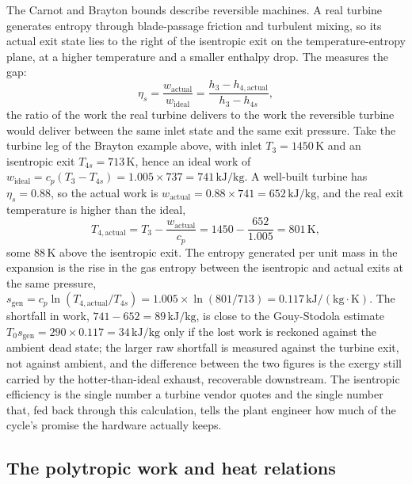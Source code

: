 The Carnot and Brayton bounds describe reversible machines. A real
turbine generates entropy through blade-passage friction and turbulent
mixing, so its actual exit state lies to the right of the isentropic exit
on the temperature-entropy plane, at a higher temperature and a smaller
enthalpy drop. The  measures the gap:
\[
\eta_s = \frac{w_{\text{actual}}}{w_{\text{ideal}}}
       = \frac{h_3 - h_{4,\text{actual}}}{h_3 - h_{4s}},
\]
the ratio of the work the real turbine delivers to the work the
reversible turbine would deliver between the same inlet state and the
same exit pressure. Take the turbine leg of the Brayton example above,
with inlet $T_3 = 1450\,\si{\kelvin}$ and an isentropic exit
$T_{4s} = 713\,\si{\kelvin}$, hence an ideal work of $w_{\text{ideal}} =
c_p (T_3 - T_{4s}) = 1.005 \times 737 = 741\,\text{kJ}/\text{kg}$. A
well-built turbine has $\eta_s = 0.88$, so the actual work is
$w_{\text{actual}} = 0.88 \times 741 = 652\,\text{kJ}/\text{kg}$, and the
real exit temperature is higher than the ideal,
\[
T_{4,\text{actual}} = T_3 - \frac{w_{\text{actual}}}{c_p}
  = 1450 - \frac{652}{1.005} = 801\,\si{\kelvin},
\]
some $88\,\si{\kelvin}$ above the isentropic exit. The entropy generated
per unit mass in the expansion is the rise in the gas entropy between the
isentropic and actual exits at the same pressure, $s_{\text{gen}} =
c_p \ln(T_{4,\text{actual}}/T_{4s}) = 1.005 \times \ln(801/713) =
0.117\,\text{kJ}/(\text{kg}\cdot\si{\kelvin})$. The shortfall in work,
$741 - 652 = 89\,\text{kJ}/\text{kg}$, is close to the Gouy-Stodola
estimate $T_0 s_{\text{gen}} = 290 \times 0.117 = 34\,\text{kJ}/\text{kg}$
only if the lost work is reckoned against the ambient dead state; the
larger raw shortfall is measured against the turbine exit, not against
ambient, and the difference between the two figures is the exergy still
carried by the hotter-than-ideal exhaust, recoverable downstream. The
isentropic efficiency is the single number a turbine vendor quotes and
the single number that, fed back through this calculation, tells the
plant engineer how much of the cycle's promise the hardware actually
keeps.

\subsection{The polytropic work and heat relations}


